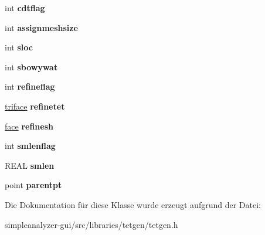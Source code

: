 \begin{DoxyCompactItemize}
\item 
\hypertarget{classtetgenmesh_1_1insertvertexflags_a165eefd6dd465126f294084ef86a7a99}{int {\bfseries cdtflag}}\label{classtetgenmesh_1_1insertvertexflags_a165eefd6dd465126f294084ef86a7a99}

\item 
\hypertarget{classtetgenmesh_1_1insertvertexflags_a1b944691a06ca5b9d27c9690732cea4a}{int {\bfseries assignmeshsize}}\label{classtetgenmesh_1_1insertvertexflags_a1b944691a06ca5b9d27c9690732cea4a}

\item 
\hypertarget{classtetgenmesh_1_1insertvertexflags_abe0f4992169d636639d0f389a674a68f}{int {\bfseries sloc}}\label{classtetgenmesh_1_1insertvertexflags_abe0f4992169d636639d0f389a674a68f}

\item 
\hypertarget{classtetgenmesh_1_1insertvertexflags_a9d380c4151120f6d0008ee61a0f410d3}{int {\bfseries sbowywat}}\label{classtetgenmesh_1_1insertvertexflags_a9d380c4151120f6d0008ee61a0f410d3}

\item 
\hypertarget{classtetgenmesh_1_1insertvertexflags_a13e91034cabc919adca3823de54de22d}{int {\bfseries refineflag}}\label{classtetgenmesh_1_1insertvertexflags_a13e91034cabc919adca3823de54de22d}

\item 
\hypertarget{classtetgenmesh_1_1insertvertexflags_ae8de017a73bd8cd9b6de4f67ae89e2c8}{\hyperlink{classtetgenmesh_1_1triface}{triface} {\bfseries refinetet}}\label{classtetgenmesh_1_1insertvertexflags_ae8de017a73bd8cd9b6de4f67ae89e2c8}

\item 
\hypertarget{classtetgenmesh_1_1insertvertexflags_a5caa7334d56feac9a16021de6b8e2bea}{\hyperlink{classtetgenmesh_1_1face}{face} {\bfseries refinesh}}\label{classtetgenmesh_1_1insertvertexflags_a5caa7334d56feac9a16021de6b8e2bea}

\item 
\hypertarget{classtetgenmesh_1_1insertvertexflags_a3d626a15b8c3ed228ad1cf85e918f169}{int {\bfseries smlenflag}}\label{classtetgenmesh_1_1insertvertexflags_a3d626a15b8c3ed228ad1cf85e918f169}

\item 
\hypertarget{classtetgenmesh_1_1insertvertexflags_aecaa1f8da0c8c7d073a4f3c0fbf1df56}{R\-E\-A\-L {\bfseries smlen}}\label{classtetgenmesh_1_1insertvertexflags_aecaa1f8da0c8c7d073a4f3c0fbf1df56}

\item 
\hypertarget{classtetgenmesh_1_1insertvertexflags_a7b72ad9649e1b63ed22bbf70e9b9d41a}{point {\bfseries parentpt}}\label{classtetgenmesh_1_1insertvertexflags_a7b72ad9649e1b63ed22bbf70e9b9d41a}

\end{DoxyCompactItemize}


Die Dokumentation für diese Klasse wurde erzeugt aufgrund der Datei\-:\begin{DoxyCompactItemize}
\item 
simpleanalyzer-\/gui/src/libraries/tetgen/tetgen.\-h\end{DoxyCompactItemize}
